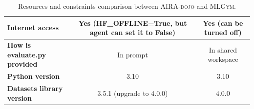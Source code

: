 \documentclass{fairmeta}
\newcommand{\airadojo}{\textsc{AIRA-dojo}}
\newcommand{\mlgym}{\textsc{MLGym}}
\begin{document}
\begin{table}[ht]
\begin{tabular}{lcc}
\textbf{Internet access} &
Yes (HF\_OFFLINE=True, but agent can set it to False) &
Yes (can be turned off) \\
\hline

\textbf{How is evaluate.py provided} &
In prompt &
In shared workspace \\
\hline

\textbf{Python version} &
3.10 &
3.10 \\
\hline

\textbf{Datasets library version} &
3.5.1 (upgrade to 4.0.0) &
4.0.0 \\

\bottomrule
\end{tabular}
\caption{Resources and constraints comparison between \airadojo{} and \mlgym{}.}
\label{app:rad-mlgym-comparison}
\end{table}
\end{document}
